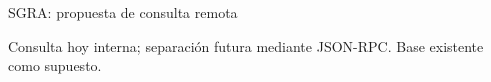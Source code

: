 \documentclass[aspectratio=169,12pt]{beamer}
\begin{document}
\begin{frame}{SGRA: propuesta de consulta remota}
\centering

\par\medskip
{\scriptsize Consulta hoy interna; separación futura mediante JSON-RPC. Base existente como supuesto.}
\end{frame}
\end{document}
